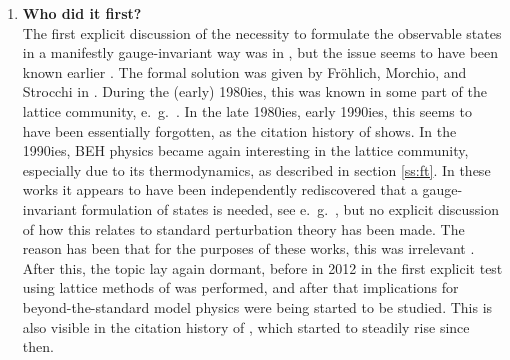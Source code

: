 \documentclass[final,12pt]{article}
\newcommand*{\1}{1\!\!\!\bot}
\begin{document}
\begin{enumerate}
 \item {\bf Who did it first?}\\
 The first explicit discussion of the necessity to formulate the observable states in a manifestly gauge-invariant way was in \cite{Banks:1979fi,'tHooft:1979bj,Frohlich:1980gj}, but the issue seems to have been known earlier \cite{Ivanov:pc,Strocchi:1977za,Osterwalder:1977pc,Englert:2004yk,Englert:2014zpa}. The formal solution was given by Fr\"ohlich, Morchio, and Strocchi in \cite{Frohlich:1980gj,Frohlich:1981yi}. During the (early) 1980ies, this was known in some part of the lattice community, e.\ g.\ \cite{Lang:pc,Shrock:1985ur,Shrock:1986av,Lee:1985yi,Olynyk:1985tr}. In the late 1980ies, early 1990ies, this seems to have been essentially forgotten, as the citation history of \cite{Frohlich:1980gj,Frohlich:1981yi} shows. In the 1990ies, BEH physics became again interesting in the lattice community, especially due to its thermodynamics, as described in section \ref{ss:ft}. In these works it appears to have been independently rediscovered that a gauge-invariant formulation of states is needed, see e.\ g.\ \cite{Karsch:1996aw,Philipsen:1996af,Philipsen:1997rq,Laine:1997nq}, but no explicit discussion of how this relates to standard perturbation theory has been made. The reason has been that for the purposes of these works, this was irrelevant \cite{Wittig:pc}. After this, the topic lay again dormant, before in 2012 in \cite{Maas:2012tj} the first explicit test using lattice methods of  \cite{Frohlich:1980gj,Frohlich:1981yi} was performed, and after that implications for beyond-the-standard model physics were being started to be studied. This is also visible in the citation history of  \cite{Frohlich:1980gj,Frohlich:1981yi}, which started to steadily rise since then.
\end{enumerate}

\itemsep -2pt


\end{document}
